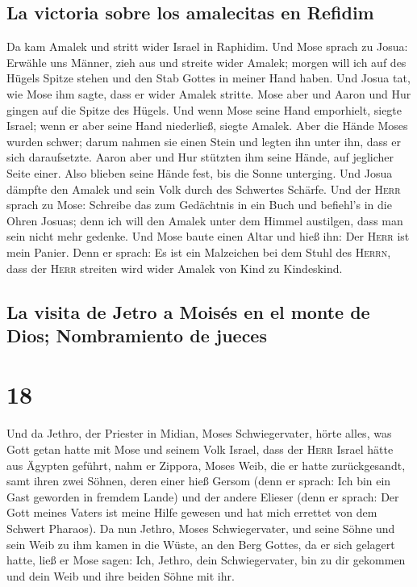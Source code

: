\hypertarget{la-victoria-sobre-los-amalecitas-en-refidim}{%
\subsection{La victoria sobre los amalecitas en
Refidim}\label{la-victoria-sobre-los-amalecitas-en-refidim}}

 Da kam Amalek und stritt wider Israel in Raphidim.
 Und Mose sprach zu Josua: Erwähle uns Männer, zieh aus
und streite wider Amalek; morgen will ich auf des Hügels Spitze stehen
und den Stab Gottes in meiner Hand haben.  Und Josua tat,
wie Mose ihm sagte, dass er wider Amalek stritte. Mose aber und Aaron
und Hur gingen auf die Spitze des Hügels.  Und wenn Mose
seine Hand emporhielt, siegte Israel; wenn er aber seine Hand
niederließ, siegte Amalek.  Aber die Hände Moses wurden
schwer; darum nahmen sie einen Stein und legten ihn unter ihn, dass er
sich daraufsetzte. Aaron aber und Hur stützten ihm seine Hände, auf
jeglicher Seite einer. Also blieben seine Hände fest, bis die Sonne
unterging.  Und Josua dämpfte den Amalek und sein Volk
durch des Schwertes Schärfe.  Und der \textsc{Herr}
sprach zu Mose: Schreibe das zum Gedächtnis in ein Buch und befiehl's in
die Ohren Josuas; denn ich will den Amalek unter dem Himmel austilgen,
dass man sein nicht mehr gedenke.  Und Mose baute einen
Altar und hieß ihn: Der \textsc{Herr} ist mein Panier. 
Denn er sprach: Es ist ein Malzeichen bei dem Stuhl des \textsc{Herrn},
dass der \textsc{Herr} streiten wird wider Amalek von Kind zu
Kindeskind.

\hypertarget{la-visita-de-jetro-a-moisuxe9s-en-el-monte-de-dios-nombramiento-de-jueces}{%
\subsection{La visita de Jetro a Moisés en el monte de Dios;
Nombramiento de
jueces}\label{la-visita-de-jetro-a-moisuxe9s-en-el-monte-de-dios-nombramiento-de-jueces}}

\hypertarget{section-17}{%
\section{18}\label{section-17}}

 Und da Jethro, der Priester in Midian, Moses
Schwiegervater, hörte alles, was Gott getan hatte mit Mose und seinem
Volk Israel, dass der \textsc{Herr} Israel hätte aus Ägypten geführt,
 nahm er Zippora, Moses Weib, die er hatte zurückgesandt,
 samt ihren zwei Söhnen, deren einer hieß Gersom (denn er
sprach: Ich bin ein Gast geworden in fremdem Lande)  und
der andere Elieser (denn er sprach: Der Gott meines Vaters ist meine
Hilfe gewesen und hat mich errettet von dem Schwert Pharaos).
 Da nun Jethro, Moses Schwiegervater, und seine Söhne und
sein Weib zu ihm kamen in die Wüste, an den Berg Gottes, da er sich
gelagert hatte,  ließ er Mose sagen: Ich, Jethro, dein
Schwiegervater, bin zu dir gekommen und dein Weib und ihre beiden Söhne
mit ihr.

